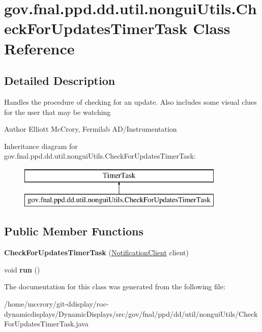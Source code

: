 \hypertarget{classgov_1_1fnal_1_1ppd_1_1dd_1_1util_1_1nonguiUtils_1_1CheckForUpdatesTimerTask}{\section{gov.\-fnal.\-ppd.\-dd.\-util.\-nongui\-Utils.\-Check\-For\-Updates\-Timer\-Task Class Reference}
\label{classgov_1_1fnal_1_1ppd_1_1dd_1_1util_1_1nonguiUtils_1_1CheckForUpdatesTimerTask}
}


\subsection{Detailed Description}
Handles the procedure of checking for an update. Also includes some visual clues for the user that may be watching

\begin{DoxyAuthor}{Author}
Elliott Mc\-Crory, Fermilab A\-D/\-Instrumentation 
\end{DoxyAuthor}
Inheritance diagram for gov.\-fnal.\-ppd.\-dd.\-util.\-nongui\-Utils.\-Check\-For\-Updates\-Timer\-Task\-:\begin{figure}[H]
\begin{center}
\leavevmode
\includegraphics[height=2.000000cm]{classgov_1_1fnal_1_1ppd_1_1dd_1_1util_1_1nonguiUtils_1_1CheckForUpdatesTimerTask}
\end{center}
\end{figure}
\subsection*{Public Member Functions}
\begin{DoxyCompactItemize}
\item 
\hypertarget{classgov_1_1fnal_1_1ppd_1_1dd_1_1util_1_1nonguiUtils_1_1CheckForUpdatesTimerTask_aefaab26ab35c0077141b6c3789267fcb}{{\bfseries Check\-For\-Updates\-Timer\-Task} (\hyperlink{interfacegov_1_1fnal_1_1ppd_1_1dd_1_1interfaces_1_1NotificationClient}{Notification\-Client} client)}\label{classgov_1_1fnal_1_1ppd_1_1dd_1_1util_1_1nonguiUtils_1_1CheckForUpdatesTimerTask_aefaab26ab35c0077141b6c3789267fcb}

\item 
\hypertarget{classgov_1_1fnal_1_1ppd_1_1dd_1_1util_1_1nonguiUtils_1_1CheckForUpdatesTimerTask_a96458e29ba739f0af05ba113396eb931}{void {\bfseries run} ()}\label{classgov_1_1fnal_1_1ppd_1_1dd_1_1util_1_1nonguiUtils_1_1CheckForUpdatesTimerTask_a96458e29ba739f0af05ba113396eb931}

\end{DoxyCompactItemize}


The documentation for this class was generated from the following file\-:\begin{DoxyCompactItemize}
\item 
/home/mccrory/git-\/ddisplay/roc-\/dynamicdisplays/\-Dynamic\-Displays/src/gov/fnal/ppd/dd/util/nongui\-Utils/Check\-For\-Updates\-Timer\-Task.\-java\end{DoxyCompactItemize}

